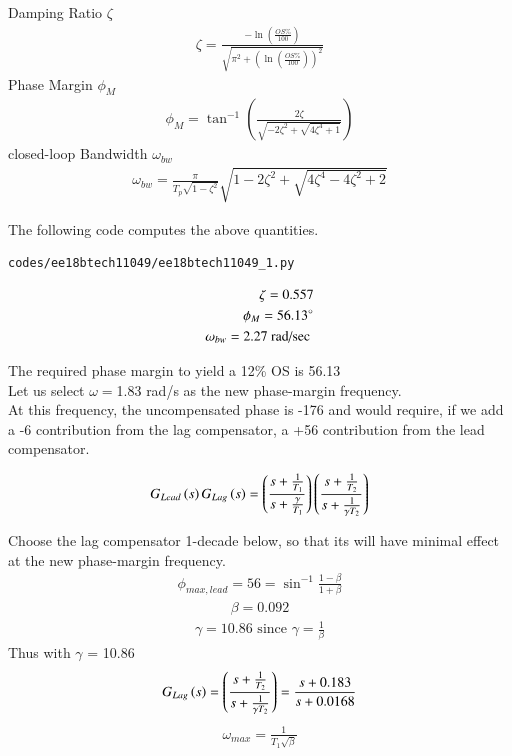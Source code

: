 \begin{enumerate}[label=\thesection.\arabic*.,ref=\thesection.\theenumi]
Damping Ratio $\zeta$
\begin{align}
    \zeta = \frac{-\ln\left(\frac{OS\%}{100}\right)}{\sqrt{\pi^2+\left(\ln\left(\frac{OS\%}{100}\right)\right)^2}}
\end{align}
Phase Margin $\phi_{M}$
\begin{align}
    \phi_{M} = \tan^{-1}\left(\frac{2\zeta}{\sqrt{-2\zeta^2 + \sqrt{4\zeta^4 + 1}}}\right)  
\end{align}
closed-loop Bandwidth $\omega_{bw}$
\begin{align}
    \omega_{bw} = \frac{\pi}{T_{p}\sqrt{1-\zeta ^2}}\sqrt{1-2\zeta^2+\sqrt{4\zeta^4 - 4\zeta ^2 + 2}}
\end{align}

The following code computes the above quantities.
\begin{lstlisting}
codes/ee18btech11049/ee18btech11049_1.py
\end{lstlisting}
\begin{align}
    \zeta  =  0.557\\
    \phi_{M} = 56.13\degree\\
     \omega_{bw} = 2.27 \text{ rad/sec }
\end{align}{}



The required phase margin to yield a 12\% OS is 56.13\degree \\
Let us select  $\omega = $1.83 rad/s as the new phase-margin frequency. \\At this frequency, the uncompensated phase is -176 and would require, if we
add a -6 contribution from the lag compensator, a +56 contribution from the
lead compensator.

\begin{align}
    G_{Lead}\left(s\right)G_{Lag}\left(s\right) = \left(\frac{s+\frac{1}{T_1}}{s+\frac{\gamma}{T_1}}\right)\left(\frac{s+\frac{1}{T_2}}{s+\frac{1}{\gamma T_2}}\right)
\end{align}

Choose the lag compensator 1-decade below, so that its
will have minimal effect at the new phase-margin frequency.
\begin{align}
     \phi_{max,lead} = 56 = \sin^{-1}{\frac{1-\beta}{1+\beta}}
\end{align}
\begin{align}
    \beta = 0.092 
\end{align}
\begin{align}
      \gamma = 10.86 \text{   since  } \gamma = \frac{1}{\beta}
\end{align}
Thus with $\gamma$ = 10.86 
\begin{align}
    G_{Lag}\left(s\right) = \left(\frac{s+\frac{1}{T_2}}{s+\frac{1}{\gamma T_2}}\right)=  \frac{s+0.183}{s+0.0168}
\end{align}
\begin{align}
    \omega_{max} = \frac{1}{T_1 \sqrt{\beta}}
\end{align}


\end{enumerate}
